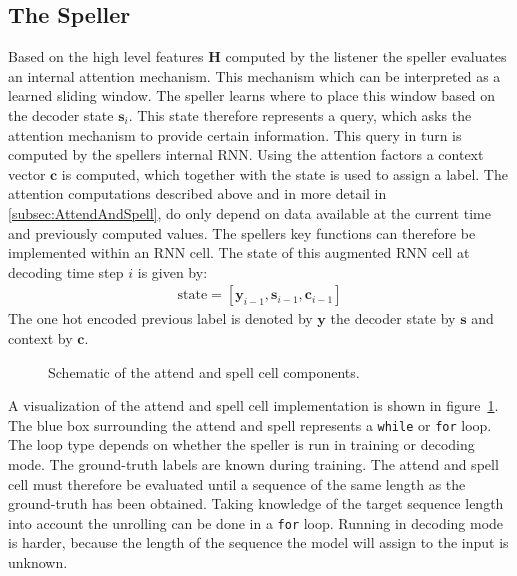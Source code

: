 \subsection{The Speller}
Based on the high level features $\mathbf{H}$ computed by the listener the speller evaluates an internal attention mechanism. This mechanism which can be interpreted as a learned sliding window. The speller learns where to place this window based on the decoder state $\mathbf{s}_i$. This state therefore represents a query, which asks the attention mechanism to provide certain information. This query in turn is computed by the spellers internal RNN.  Using the attention factors a context vector $\mathbf{c}$ is computed, which together with the state is used to assign a label. 
The attention computations described above and in more detail in \ref{subsec:AttendAndSpell}, do only depend on data available at the current time and previously computed values. The spellers key functions can therefore be implemented within an RNN cell. The state of this augmented RNN cell at decoding time step $i$ is given by:
\begin{align}
\text{state} =  [\mathbf{y}_{i-1}, \mathbf{s}_{i-1}, \mathbf{c}_{i-1}]
\end{align}
The one hot encoded previous label is denoted by $\mathbf{y}$ the decoder state by $\mathbf{s}$ and context by $\mathbf{c}$.
\begin{figure}
\centering

\caption{Schematic of the attend and spell cell components.}
\label{fig:asCell}
\end{figure}
A visualization of the attend and spell cell implementation is shown in figure~\ref{fig:asCell}. The blue box surrounding the attend and spell represents a \texttt{while} or \texttt{for} loop. The loop type depends on whether the speller is run in training or decoding mode. 
The ground-truth labels are known during training. The attend and spell cell must therefore be evaluated until a sequence of the same length as the ground-truth has been obtained. Taking knowledge of the target sequence length into account the unrolling can be done in a \texttt{for} loop. 
Running in decoding mode is harder, because the length of the sequence the model will assign to the input is unknown. 

